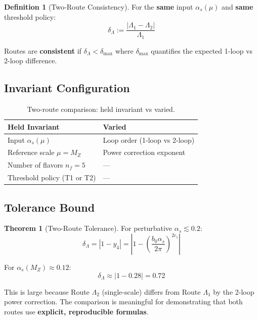 \documentclass[11pt,a4paper]{article}
\theoremstyle{definition}
\newtheorem{definition}{Definition}[section]
\newtheorem{theorem}{Theorem}[section]
\begin{document}
\begin{definition}[Two-Route Consistency]
\label{def:two-route}
For the \textbf{same} input $\alpha_s(\mu)$ and \textbf{same} threshold policy:
\begin{equation}
\label{eq:two-route-def}
\delta_\Lambda := \frac{|\Lambda_1 - \Lambda_2|}{\Lambda_1}
\end{equation}

Routes are \textbf{consistent} if $\delta_\Lambda < \delta_{\max}$ where $\delta_{\max}$
quantifies the expected 1-loop vs 2-loop difference.
\end{definition}

\subsection{Invariant Configuration}
\label{subsec:invariant-config}

\begin{table}[ht]
\centering
\caption{Two-route comparison: held invariant vs varied.}
\label{tab:invariant-config}
\begin{tabular}{ll}
\toprule
\textbf{Held Invariant} & \textbf{Varied} \\
\midrule
Input $\alpha_s(\mu)$ & Loop order (1-loop vs 2-loop) \\
Reference scale $\mu = M_Z$ & Power correction exponent \\
Number of flavors $n_f = 5$ & --- \\
Threshold policy (T1 or T2) & --- \\
\bottomrule
\end{tabular}
\end{table}

\subsection{Tolerance Bound}
\label{subsec:tolerance}

\begin{theorem}[Two-Route Tolerance]
\label{thm:tolerance}
For perturbative $\alpha_s \lesssim 0.2$:
\begin{equation}
\label{eq:tolerance-bound}
\delta_\Lambda = |1 - y_4| = \left|1 - \left(\frac{b_0\alpha_s}{2\pi}\right)^{2c_1}\right|
\end{equation}

For $\alpha_s(M_Z) \approx 0.12$:
\begin{equation}
\label{eq:tolerance-estimate}
\delta_\Lambda \approx |1 - 0.28| = 0.72
\end{equation}

This is large because Route $\Lambda_2$ (single-scale) differs from Route $\Lambda_1$
by the 2-loop power correction. The comparison is meaningful for demonstrating
that both routes use \textbf{explicit, reproducible formulas}.
\end{theorem}
\end{document}
